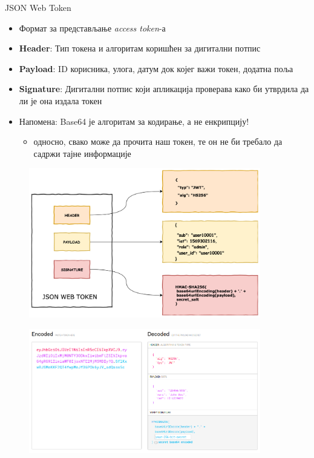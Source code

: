 \documentclass{beamer}
\begin{document}
    \begin{frame}[allowframebreaks]{JSON Web Token}
        \begin{itemize}
            \item Формат за представљање \textit{access token}-а
            \item \textbf{Header}: Тип токена и алгоритам коришћен за дигитални потпис
            \item \textbf{Payload}: ID корисника, улога, датум док којег важи токен, додатна поља
            \item \textbf{Signature}: Дигитални потпис који апликација проверава како би утврдила да ли је она издала токен
            \item Напомена: Base64 је алгоритам за кодирање, а не енкрипцију!
            \begin{itemize}
                \item односно, свако може да прочита наш токен, те он не би требало да садржи тајне информације
            \end{itemize}
        \end{itemize}
        
        \framebreak
        
        \begin{figure}
            \centering
            \includegraphics[width=0.9\textwidth,height=0.9\textheight,keepaspectratio]{images/jwt.png}
            \label{fig:jwt}
        \end{figure}
        
        \framebreak
        
        \begin{figure}
            \centering
            \includegraphics[width=0.9\textwidth,height=0.9\textheight,keepaspectratio]{images/jwt_enc.png}
            \label{fig:jwt_enc}
        \end{figure}
    \end{frame}
    
\end{document}
